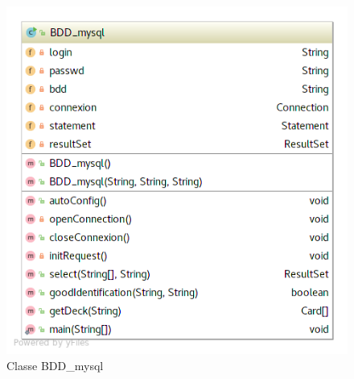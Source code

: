\documentclass[a4paper,11pt]{report}
\begin{document}
  \begin{figure}[th]
      \begin{center}
        \includegraphics[scale=0.4]{Assets/UML_BDD.png}
        \caption{Classe BDD_mysql}
        \label{Classe BDD_mysql}
      \end{center}
    \end{figure}
    
\end{document}
